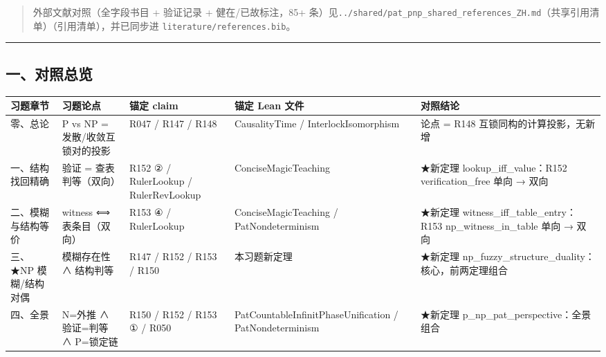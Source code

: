 \documentclass[
]{article}
\newcounter{none} %
\begin{document}
\begin{quote}
外部文献对照（全字段书目 + 验证记录 + 健在/已故标注，85+
条）见\texttt{../shared/pat\_pnp\_shared\_references\_ZH.md}（共享引用清单）（引用清单），并已同步进
\texttt{literature/references.bib}。
\end{quote}

\begin{center}\rule{0.5\linewidth}{0.5pt}\end{center}

\subsection{一、对照总览}\label{ux4e00ux5bf9ux7167ux603bux89c8}

{\def\LTcaptype{none} %
\begin{longtable}[]{@{}
 >{\raggedright\arraybackslash}p{}
 >{\raggedright\arraybackslash}p{}
 >{\raggedright\arraybackslash}p{}
 >{\raggedright\arraybackslash}p{}
 >{\raggedright\arraybackslash}p{}@{}}
\toprule\noalign{}
\begin{minipage}[b]{\linewidth}\raggedright
习题章节
\end{minipage} & \begin{minipage}[b]{\linewidth}\raggedright
习题论点
\end{minipage} & \begin{minipage}[b]{\linewidth}\raggedright
锚定 claim
\end{minipage} & \begin{minipage}[b]{\linewidth}\raggedright
锚定 Lean 文件
\end{minipage} & \begin{minipage}[b]{\linewidth}\raggedright
对照结论
\end{minipage} \\
\midrule\noalign{}
\endhead
\bottomrule\noalign{}
\endlastfoot
零、总论 & P vs NP = 发散/收敛互锁对的投影 & R047 / R147 / R148 &
CausalityTime / InterlockIsomorphism & 论点 = R148
互锁同构的计算投影，无新增 \\
一、结构找回精确 & 验证 = 查表判等（双向） & R152 ② / RulerLookup /
RulerRevLookup & ConciseMagicTeaching & ★新定理 lookup\_iff\_value：R152
verification\_free 单向 → 双向 \\
二、模糊与结构等价 & witness ⟺ 表条目（双向） & R153 ④ / RulerLookup &
ConciseMagicTeaching / PatNondeterminism & ★新定理
witness\_iff\_table\_entry：R153 np\_witness\_in\_table 单向 → 双向 \\
三、★NP 模糊/结构对偶 & 模糊存在性 ∧ 结构判等 & R147 / R152 / R153 /
R150 & 本习题新定理 & ★新定理
np\_fuzzy\_structure\_duality：核心，前两定理组合 \\
四、全景 & N=外推 ∧ 验证=判等 ∧ P=锁定链 & R150 / R152 / R153 ① / R050 &
PatCountableInfinitPhaseUnification / PatNondeterminism & ★新定理
p\_np\_pat\_perspective：全景组合 \\
\end{longtable}
}
\end{document}
